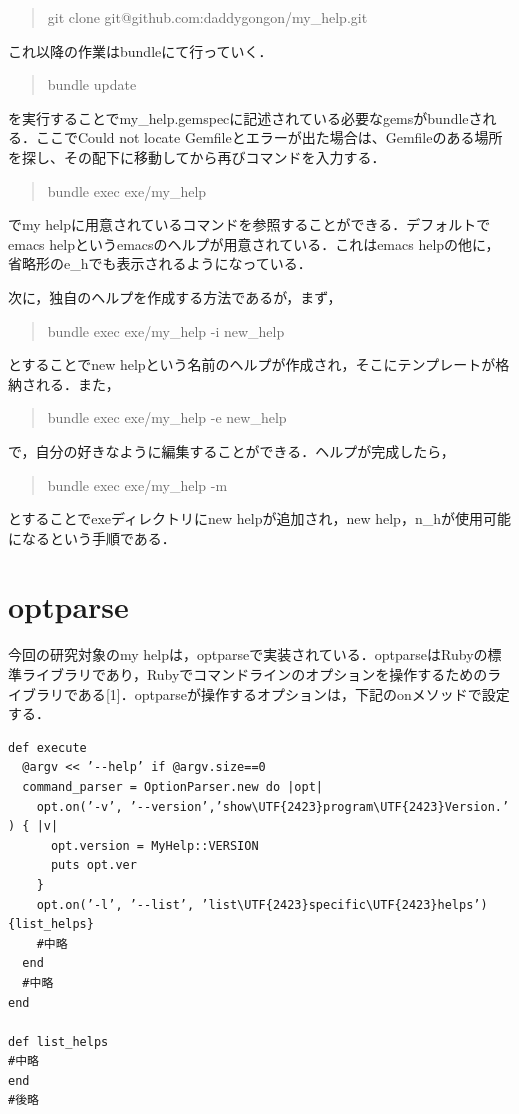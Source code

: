 \begin{quote}
git clone git@github.com:daddygongon/my\_help.git
\end{quote}
これ以降の作業はbundleにて行っていく．

\begin{quote}
bundle update
\end{quote}
を実行することでmy\_help.gemspecに記述されている必要なgemsがbundleされる．ここでCould
not locate
Gemfileとエラーが出た場合は、Gemfileのある場所を探し、その配下に移動してから再びコマンドを入力する．

\begin{quote}
bundle exec exe/my\_help
\end{quote}
でmy
helpに用意されているコマンドを参照することができる．デフォルトでemacs
helpというemacsのヘルプが用意されている．これはemacs
helpの他に，省略形のe\_hでも表示されるようになっている．

次に，独自のヘルプを作成する方法であるが，まず，

\begin{quote}
bundle exec exe/my\_help -i new\_help
\end{quote}
とすることでnew
helpという名前のヘルプが作成され，そこにテンプレートが格納される．また，

\begin{quote}
bundle exec exe/my\_help -e new\_help
\end{quote}
で，自分の好きなように編集することができる．ヘルプが完成したら，

\begin{quote}
bundle exec exe/my\_help -m
\end{quote}
とすることでexeディレクトリにnew helpが追加され，new
help，n\_hが使用可能になるという手順である．

\section{optparse}\label{optparse}

今回の研究対象のmy
helpは，optparseで実装されている．optparseはRubyの標準ライブラリであり，Rubyでコマンドラインのオプションを操作するためのライブラリである{[}1{]}．optparseが操作するオプションは，下記のonメソッドで設定する．

\begin{screen}
{\small
\begin{verbatim}
def execute
  @argv << ’--help’ if @argv.size==0
  command_parser = OptionParser.new do |opt|
    opt.on(’-v’, ’--version’,’show\UTF{2423}program\UTF{2423}Version.’ ) { |v|
      opt.version = MyHelp::VERSION
      puts opt.ver
    }
    opt.on(’-l’, ’--list’, ’list\UTF{2423}specific\UTF{2423}helps’){list_helps}
    #中略
  end
  #中略
end
    
def list_helps
#中略
end
#後略
\end{verbatim}}
\end{screen}


